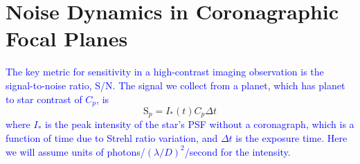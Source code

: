 \documentclass[10pt,preprint]{aastex631}
\newcommand{\jrmadd}[1]{\textcolor{blue}{#1}}
\begin{document}


\section{Noise Dynamics in Coronagraphic Focal Planes}
\label{sec:noise}
\jrmadd{The key metric for sensitivity in a high-contrast imaging observation is the signal-to-noise ratio, S/N.  The signal we collect from a planet, which has planet to star contrast of $C_p$, is }
\begin{equation}
\mbox{S}_p = I_{*}(t) C_p \Delta t
\end{equation}
\jrmadd{where $I_{*}$ is the peak intensity of the star's PSF without a coronagraph, which is a function of time due to Strehl ratio variation, and $\Delta t$ is the exposure time.  Here we will assume units of photons/$(\lambda/D)^2$/second for the intensity.}
\end{document}
